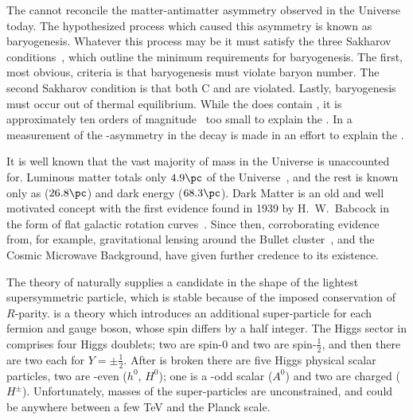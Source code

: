 The \sm cannot reconcile the matter-antimatter asymmetry observed in the
Universe today.
The hypothesized process which caused this asymmetry is known as baryogenesis.
Whatever this process may be it must satisfy the three Sakharov
conditions~\cite{1991SvPhU..34..392S}, which outline the minimum requirements for baryogenesis.
The first, most obvious, criteria is that baryogenesis must violate baryon number.
The second Sakharov condition is that both \gls{C} and \CP are violated.
Lastly, baryogenesis must occur out of thermal equilibrium.
While the \sm does contain \CPV, it is approximately ten orders of
magnitude~\cite{Cline:2006ts,Huet:1994jb} too small to explain the \BAU.
In  a measurement of the \CP-asymmetry in the decay \btodsphi is made in an effort
to explain the \BAU.


It is well known that the vast majority of mass in the Universe is unaccounted for.
Luminous matter totals only \approx$4.9\pc$ of the Universe~\cite{Adam:2015rua,PDG2014}, and the rest
is known only as \dm (\approx$26.8\pc$) and dark energy (\approx$68.3\pc$).
Dark Matter is an old and well motivated concept with the first evidence found in 1939 by H.~W.~Babcock
in the form of flat galactic rotation curves~\cite{1970ApJ...159..379R,1980ApJ...238..471R}.
Since then, corroborating evidence from, for example, gravitational lensing around the Bullet
cluster~\cite{Markevitch:2003at}, and the Cosmic Microwave Background, have given further credence
to its existence.

The theory of \SUSY naturally supplies a \dm candidate in the shape of the lightest supersymmetric
particle, which is stable because of the imposed conservation of $R$-parity.
\SUSY is a theory which introduces an additional super-particle for each \sm fermion and
gauge boson, whose spin differs by a half integer.
The Higgs sector in \SUSY comprises four Higgs doublets; two are spin-0 and two are spin-$\tfrac12$,
and then there are two each for $Y=\pm\tfrac12$.
After \SUSY is broken there are five Higgs physical scalar particles, two are \CP-even ($h^0$,
$H^0$); one is a \CP-odd scalar ($A^0$) and two are charged ($H^\pm$).
Unfortunately, masses of the super-particles are unconstrained, and could be anywhere between a few
TeV and the Planck scale.

